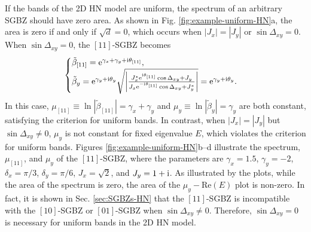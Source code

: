 \documentclass[pdflatex,sn-nature, iicol]{sn-jnl}%
\theoremstyle{thmstyleone}%
\theoremstyle{thmstyletwo}%
\theoremstyle{thmstylethree}%
\begin{document}
If the bands of the 2D HN model are uniform, the spectrum of an arbitrary
SGBZ should have zero area. As shown in Fig. \ref{fig:example-uniform-HN}a,
the area is zero if and only if $\sqrt{d}=0$, which occurs when $|J_{x}|=|J_{y}|$
or $\sin\Delta_{xy}=0$. When $\sin\Delta_{xy}=0$, the $[11]$-SGBZ
becomes 
\begin{equation}
\begin{cases}
\tilde{\beta}_{[11]}=\mathrm{e}^{\gamma_{x}+\gamma_{y}+\mathrm{i}\theta_{[11]}},\\
\tilde{\beta}_{y}=\mathrm{e}^{\gamma_{y}+\mathrm{i}\theta_{y}}\sqrt{\left|\frac{J_{x}^{*}\mathrm{e}^{\mathrm{i}\theta_{[11]}}\cos\Delta_{xy}+J_{y}}{J_{x}\mathrm{e}^{-\mathrm{i}\theta_{[11]}}\cos\Delta_{xy}+J_{y}^{*}}\right|}=\mathrm{e}^{\gamma_{y}+\mathrm{i}\theta_{y}}.
\end{cases}
\end{equation}
In this case, $\mu_{[11]}\equiv\ln|\tilde{\beta}_{[11]}|=\gamma_{x}+\gamma_{y}$
and $\mu_{y}\equiv\ln|\tilde{\beta}_{y}|=\gamma_{y}$ are both constant,
satisfying the criterion for uniform bands. In contrast, when $|J_{x}|=|J_{y}|$
but $\sin\Delta_{xy}\neq0$, $\mu_{y}$ is not constant for fixed
eigenvalue $E$, which violates the criterion for uniform bands. Figures
\ref{fig:example-uniform-HN}b--d illustrate the spectrum, $\mu_{[11]}$,
and $\mu_{y}$ of the $[11]$-SGBZ, where the parameters are $\gamma_{x}=1.5$,
$\gamma_{y}=-2$, $\delta_{x}=\pi/3$, $\delta_{y}=\pi/6$, $J_{x}=\sqrt{2}$,
and $J_{y}=1+\mathrm{i}$. As illustrated by the plots, while the area of
the spectrum is zero, the area of the $\mu_{y}-\text{Re}(E)$ plot
is non-zero. In fact, it is shown in Sec. \ref{sec:SGBZs-HN} that
the $[11]$-SGBZ is incompatible with the $[10]$-SGBZ or $[01]$-SGBZ
when $\sin\Delta_{xy}\neq0$. Therefore, $\sin\Delta_{xy}=0$ is necessary
for uniform bands in the 2D HN model.
\end{document}
